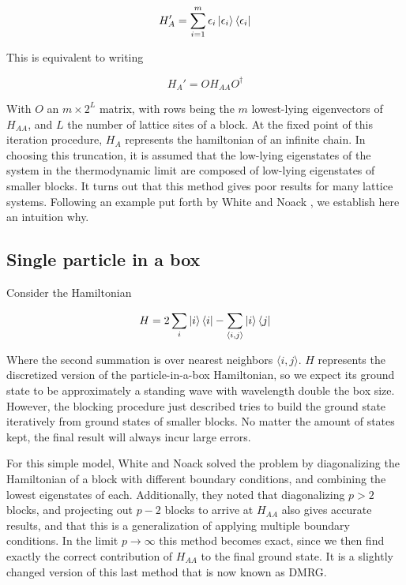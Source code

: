 \begin{equation}
  H_{A}' = \sum_{i = 1}^{m} \epsilon_{i} \ket{\epsilon_{i}}\bra{\epsilon_{i}}
 \end{equation}

This is equivalent to writing

\begin{equation}
  H_{A}' = O H_{AA} O^{\dagger}
\end{equation}

With $O$ an $m \times 2^L$ matrix, with rows being the $m$ lowest-lying
eigenvectors of $H_{AA}$, and $L$ the number of lattice sites of a block. At
the fixed point of this iteration procedure, $H_A$ represents the
hamiltonian of an infinite chain.  In choosing this truncation, it is assumed that the
low-lying eigenstates of the system in the thermodynamic limit are
composed of low-lying eigenstates of smaller blocks. It turns out that
this method gives poor results for many lattice systems. Following an
example put forth by White and Noack \cite{white1992real}, we establish
here an intuition why.

\subsection{Single particle in a box}

Consider the Hamiltonian

\begin{equation}
  H = 2 \sum_i \ket{i}\bra{i} - \sum_{\langle i, j \rangle} \ket{i}\bra{j}
\end{equation}

Where the second summation is over nearest neighbors $\langle i,
j \rangle$. $H$ represents the discretized version of the
particle-in-a-box Hamiltonian, so we expect its ground state to be
approximately a standing wave with wavelength double the box size.
However, the blocking procedure just described tries to build the ground
state iteratively from ground states of smaller blocks. No matter the
amount of states kept, the final result will always incur large errors.

For this simple model, White and Noack solved the problem by diagonalizing
the Hamiltonian of a block with different boundary conditions, and
combining the lowest eigenstates of each. Additionally, they noted that
diagonalizing $p > 2$ blocks, and projecting out $p - 2$ blocks to arrive
at $H_{AA}$ also gives accurate results, and that this is a generalization
of applying multiple boundary conditions. In the limit $p \to \infty$
this method becomes exact, since we then find exactly the correct
contribution of $H_{AA}$ to the final ground state. It is a slightly
changed version of this last method that is now known as DMRG.


